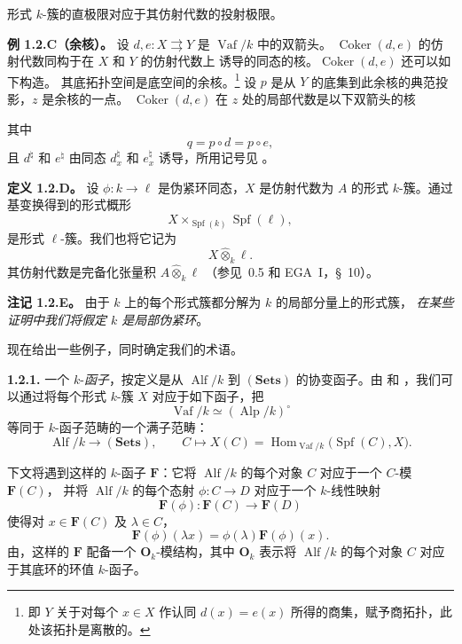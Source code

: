 形式 \(k\)-簇的直极限对应于其仿射代数的投射极限。

\medskip
\noindent\textbf{例 1.2.C（余核）。}
\label{sga3:VIIB:1.2.C}
设 \(d,e:X\rightrightarrows Y\) 是 \(\operatorname{Vaf}/k\) 中的双箭头。
\(\operatorname{Coker}(d,e)\) 的仿射代数同构于在 \(X\) 和 \(Y\) 的仿射代数上
诱导的同态的核。\(\operatorname{Coker}(d,e)\) 还可以如下构造。
其底拓扑空间是底空间的余核。\footnote{%
\label{sga3:VIIB:nde:42}即 \(Y\) 关于对每个 \(x\in X\) 作认同
\(d(x)=e(x)\) 所得的商集，赋予商拓扑，此处该拓扑是离散的。}
设 \(p\) 是从 \(Y\) 的底集到此余核的典范投影，\(z\) 是余核的一点。
\(\operatorname{Coker}(d,e)\) 在 \(z\) 处的局部代数是以下双箭头的核
\begin{center}
  \label{sga3:VIIB:1.2.C-cokernel-double-arrow}
  
\end{center}
其中
\[
  q=p\circ d=p\circ e,
\]
且 \(d^\natural\) 和 \(e^\natural\) 由同态
\(d_x^\natural\) 和 \(e_x^\natural\) 诱导，所用记号见 。

\medskip
\noindent\textbf{定义 1.2.D。}
\label{sga3:VIIB:1.2.D}
设 \(\phi:k\to\ell\) 是伪紧环同态，\(X\) 是仿射代数为 \(A\) 的形式
\(k\)-簇。通过基变换得到的形式概形
\[
  X\times_{\operatorname{Spf}(k)}\operatorname{Spf}(\ell),
\]
是形式 \(\ell\)-簇。我们也将它记为
\[
  X\widehat{\otimes}_k\ell.
\]
其仿射代数是完备化张量积 \(A\widehat{\otimes}_k\ell\)
（参见\ 0.5 和 EGA~I，\S~10）。

\medskip
\noindent\textbf{注记 1.2.E。}
\label{sga3:VIIB:1.2.E}
由于 \(k\) 上的每个形式簇都分解为 \(k\) 的局部分量上的形式簇，
\emph{在某些证明中我们将假定 \(k\) 是局部伪紧环}。

现在给出一些例子，同时确定我们的术语。

\medskip
\noindent\textbf{1.2.1.}
\label{sga3:VIIB:1.2.1}
一个 \(k\)-\emph{函子}，按定义是从 \(\operatorname{Alf}/k\) 到
\((\mathbf{Sets})\) 的协变函子。由  和
，我们可以通过将每个形式 \(k\)-簇 \(X\)
对应于如下函子，把
\[
  \operatorname{Vaf}/k
  \simeq
  (\operatorname{Alp}/k)^\circ
\]
等同于 \(k\)-函子范畴的一个满子范畴：
\[
  \operatorname{Alf}/k\longrightarrow(\mathbf{Sets}),
  \qquad
  C\longmapsto
  X(C)=
  \operatorname{Hom}_{\operatorname{Vaf}/k}
    \bigl(\operatorname{Spf}(C),X\bigr).
\]

下文将遇到这样的 \(k\)-函子 \(\mathbf F\)：它将
\(\operatorname{Alf}/k\) 的每个对象 \(C\) 对应于一个 \(C\)-模 \(\mathbf F(C)\)，
并将 \(\operatorname{Alf}/k\) 的每个态射 \(\phi:C\to D\) 对应于一个 \(k\)-线性映射
\[
  \mathbf F(\phi):\mathbf F(C)\longrightarrow\mathbf F(D)
\]
使得对 \(x\in\mathbf F(C)\) 及 \(\lambda\in C\)，
\[
  \mathbf F(\phi)(\lambda x)
  =
  \phi(\lambda)\mathbf F(\phi)(x).
\]
由，这样的 \(\mathbf F\)
配备一个 \(\mathbf O_k\)-模结构，其中 \(\mathbf O_k\) 表示将
\(\operatorname{Alf}/k\) 的每个对象 \(C\) 对应于其底环的环值 \(k\)-函子。

